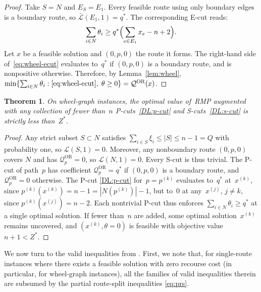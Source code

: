 \documentclass{article}
\newtheorem{theorem}{Theorem}
\begin{document}
{\begin{proof}
Take $S=N$ and $E_S=E_1$. Every feasible route using only boundary edges is a boundary route, so $\bar{\mathcal{L}}(E_1,1)=q^*$. The corresponding E-cut reads:
\begin{equation}\label{eq:wheel-ecut}
  \sum_{i\in N}\theta_i
  \geq
  q^*\Bigl(\sum_{e\in E_1} x_e - n + 2\Bigr).
\end{equation}
Let $x$ be a feasible solution and $(0,p,0)$ the route it forms. The right-hand side of~\eqref{eq:wheel-ecut} evaluates to~$q^*$ if $(0,p,0)$ is a boundary route, and is nonpositive otherwise. Therefore, by Lemma~\ref{lem:wheel}, $\min\{\sum_{i\in N}\theta_i : \eqref{eq:wheel-ecut},\; \theta \geq 0\} = \mathcal{Q}^{\text{OR}}(x)$.
\end{proof}

\begin{theorem}\label{thm:n-DL}
On wheel-graph instances, the optimal value of~RMP augmented with any collection of fewer than~$n$ P-cuts~\eqref{DL:p-cut} and S-cuts~\eqref{DL:s-cut} is strictly less than~$Z^*$.
\end{theorem}

\begin{proof}
Any strict subset $S \subset N$ satisfies $\sum_{i \in S}\xi_i \leq |S| \leq n-1 = Q$ with probability one, so $\mathcal{L}(S,1) = 0$. Moreover, any nonboundary route $(0,p,0)$ covers $N$ and has $\mathcal{Q}^{\text{OR}}_p = 0$, so $\mathcal{L}(N,1) = 0$. Every S-cut is thus trivial. The P-cut of path~$p$ has coefficient $\mathcal{Q}^{\text{OR}}_p = q^*$ if $(0,p,0)$ is a boundary route, and $\mathcal{Q}^{\text{OR}}_p = 0$ otherwise. The P-cut \eqref{DL:p-cut} for~$p=p^{(k)}$ evaluates to~$q^*$ at~$x^{(k)}$, since $p^{(k)}(x^{(k)})=n-1=|N(p^{(k)})|-1$, but to~$0$ at any~$x^{(j)}$, $j \neq k$, since $p^{(k)}(x^{(j)})=n-2$. Each nontrivial P-cut thus enforces $\sum_{i \in N}\theta_i \geq q^*$ at a single optimal solution. If fewer than~$n$ are added, some optimal solution~$x^{(k)}$ remains uncovered, and $(x^{(k)}, \theta = 0)$ is feasible with objective value $n+1 < Z^*$.
\end{proof}

We now turn to the valid inequalities from \cite{hoogendoorn2023improved}. First, we note that, for single-route instances where there exists a feasible solution with zero recourse cost (in particular, for wheel-graph instances), all the families of valid inequalities therein are subsumed by the partial route-split inequalities \eqref{eq:prs}.

}
\end{document}
